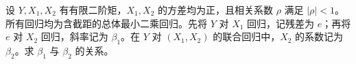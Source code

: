 设 $Y,X_1,X_2$ 有有限二阶矩，$X_1,X_2$ 的方差均为正，且相关系数 $\rho$ 满足 $|\rho|<1$。所有回归均为含截距的总体最小二乘回归。先将 $Y$ 对 $X_1$ 回归，记残差为 $e$；再将 $e$ 对 $X_2$ 回归，斜率记为 $\beta_1$。在 $Y$ 对 $(X_1,X_2)$ 的联合回归中，$X_2$ 的系数记为 $\beta_2$。求 $\beta_1$ 与 $\beta_2$ 的关系。
